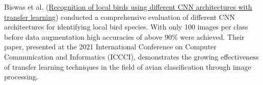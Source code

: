\documentclass[a4paper,12pt]{article}
\begin{document}
Biswas et al. (\href{https://ieeexplore.ieee.org/document/9402304}{Recognition of local birds using different CNN architectures with transfer learning}) conducted a comprehensive evaluation of different CNN architectures for identifying local bird species. With only 100 images per class before data augmentation high accuracies of above 90\% were achieved. Their paper, presented at the 2021 International Conference on Computer Communication and Informatics (ICCCI), demonstrates the growing effectiveness of transfer learning techniques in the field of avian classification through image processing.




\end{document}
